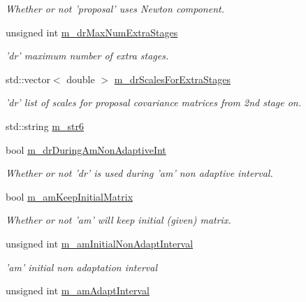 \begin{DoxyCompactItemize}
\begin{DoxyCompactList}\small\item\em Whether or not 'proposal' uses Newton component. \end{DoxyCompactList}\item 
unsigned int \hyperlink{class_q_u_e_s_o_1_1_m_l_sampling_level_options_ab854494640bb98cad74ee656e62daab3}{m\-\_\-dr\-Max\-Num\-Extra\-Stages}
\begin{DoxyCompactList}\small\item\em 'dr' maximum number of extra stages. \end{DoxyCompactList}\item 
std\-::vector$<$ double $>$ \hyperlink{class_q_u_e_s_o_1_1_m_l_sampling_level_options_ab4bdcc9166bc8cdbc9f5915dcb77e34a}{m\-\_\-dr\-Scales\-For\-Extra\-Stages}
\begin{DoxyCompactList}\small\item\em 'dr' list of scales for proposal covariance matrices from 2nd stage on. \end{DoxyCompactList}\item 
std\-::string \hyperlink{class_q_u_e_s_o_1_1_m_l_sampling_level_options_a57c51b01f2dd9dcf3ae13a6891c72b78}{m\-\_\-str6}
\item 
bool \hyperlink{class_q_u_e_s_o_1_1_m_l_sampling_level_options_a0824b7f76b5a6ee901f6a5edc0e130b8}{m\-\_\-dr\-During\-Am\-Non\-Adaptive\-Int}
\begin{DoxyCompactList}\small\item\em Whether or not 'dr' is used during 'am' non adaptive interval. \end{DoxyCompactList}\item 
bool \hyperlink{class_q_u_e_s_o_1_1_m_l_sampling_level_options_a9adec09f474c263078450c6ad66518e5}{m\-\_\-am\-Keep\-Initial\-Matrix}
\begin{DoxyCompactList}\small\item\em Whether or not 'am' will keep initial (given) matrix. \end{DoxyCompactList}\item 
unsigned int \hyperlink{class_q_u_e_s_o_1_1_m_l_sampling_level_options_a75d028be834232b634bf5a23dcc73ed1}{m\-\_\-am\-Initial\-Non\-Adapt\-Interval}
\begin{DoxyCompactList}\small\item\em 'am' initial non adaptation interval \end{DoxyCompactList}\item 
unsigned int \hyperlink{class_q_u_e_s_o_1_1_m_l_sampling_level_options_abf7bc1e5bb55727e5c92bec2e49974a6}{m\-\_\-am\-Adapt\-Interval}

\end{DoxyCompactItemize}
